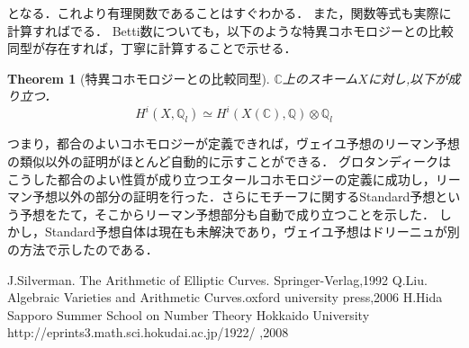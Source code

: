 \documentclass{ujarticle}
\newtheorem{thm}{Theorem}[section]
\begin{document}
となる．これより有理関数であることはすぐわかる．
また，関数等式も実際に計算すればでる．
Betti数についても，以下のような特異コホモロジーとの比較同型が存在すれば，丁寧に計算することで示せる．
\begin{thm}[特異コホモロジーとの比較同型]
$\mathbb{C}$上のスキーム$X$に対し,以下が成り立つ．
\begin{equation*}
 H^i(X,\mathbb{Q}_l) \simeq H^i(X(\mathbb{C}),\mathbb{Q})\otimes \mathbb{Q}_l
\end{equation*}
\end{thm}
つまり，都合のよいコホモロジーが定義できれば，ヴェイユ予想のリーマン予想の類似以外の証明がほとんど自動的に示すことができる．
グロタンディークはこうした都合のよい性質が成り立つエタールコホモロジーの定義に成功し，リーマン予想以外の部分の証明を行った．さらにモチーフに関するStandard予想という予想をたて，そこからリーマン予想部分も自動で成り立つことを示した．
しかし，Standard予想自体は現在も未解決であり，ヴェイユ予想はドリーニュが別の方法で示したのである．

\begin{thebibliography}{数字}
 J.Silverman. The Arithmetic of Elliptic Curves. Springer-Verlag,1992
 Q.Liu. Algebraic Varieties and Arithmetic Curves.oxford university press,2006
 H.Hida Sapporo Summer School on Number Theory Hokkaido University http://eprints3.math.sci.hokudai.ac.jp/1922/ ,2008
\end{thebibliography}
\end{document}
